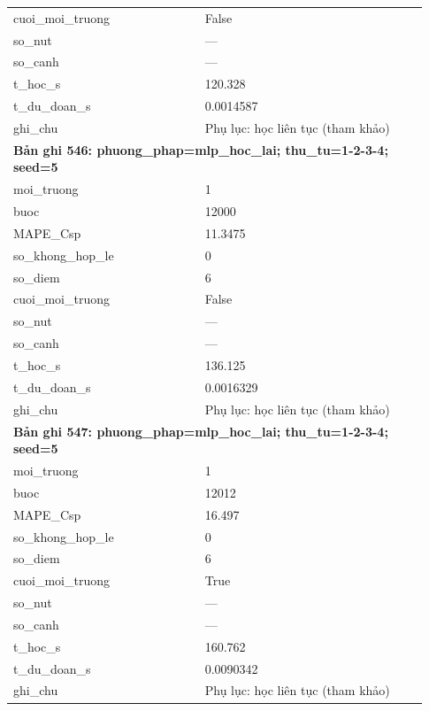 \begin{longtable}{p{0.43\linewidth}p{0.50\linewidth}}
cuoi\_\allowbreak moi\_\allowbreak truong & False \\
so\_\allowbreak nut & — \\
so\_\allowbreak canh & — \\
t\_\allowbreak hoc\_\allowbreak s & 120.328 \\
t\_\allowbreak du\_\allowbreak doan\_\allowbreak s & 0.0014587 \\
ghi\_\allowbreak chu & Phụ lục: học liên tục (tham khảo) \\
\midrule
\multicolumn{2}{p{0.95\linewidth}}{\textbf{Bản ghi 546: phuong\_phap=mlp\_hoc\_lai; thu\_tu=1-2-3-4; seed=5}} \\
moi\_\allowbreak truong & 1 \\
buoc & 12000 \\
MAPE\_\allowbreak Csp & 11.3475 \\
so\_\allowbreak khong\_\allowbreak hop\_\allowbreak le & 0 \\
so\_\allowbreak diem & 6 \\
cuoi\_\allowbreak moi\_\allowbreak truong & False \\
so\_\allowbreak nut & — \\
so\_\allowbreak canh & — \\
t\_\allowbreak hoc\_\allowbreak s & 136.125 \\
t\_\allowbreak du\_\allowbreak doan\_\allowbreak s & 0.0016329 \\
ghi\_\allowbreak chu & Phụ lục: học liên tục (tham khảo) \\
\midrule
\multicolumn{2}{p{0.95\linewidth}}{\textbf{Bản ghi 547: phuong\_phap=mlp\_hoc\_lai; thu\_tu=1-2-3-4; seed=5}} \\
moi\_\allowbreak truong & 1 \\
buoc & 12012 \\
MAPE\_\allowbreak Csp & 16.497 \\
so\_\allowbreak khong\_\allowbreak hop\_\allowbreak le & 0 \\
so\_\allowbreak diem & 6 \\
cuoi\_\allowbreak moi\_\allowbreak truong & True \\
so\_\allowbreak nut & — \\
so\_\allowbreak canh & — \\
t\_\allowbreak hoc\_\allowbreak s & 160.762 \\
t\_\allowbreak du\_\allowbreak doan\_\allowbreak s & 0.0090342 \\
ghi\_\allowbreak chu & Phụ lục: học liên tục (tham khảo) \\

\end{longtable}
